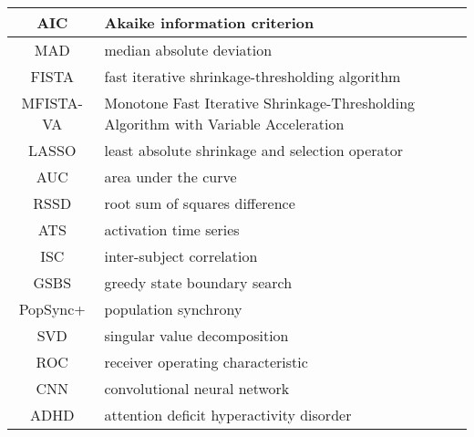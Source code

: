 \begin{table}[h]
\begin{tabular}{|c|p{}|}
    \hline
    AIC & Akaike information criterion \\
    \hline
    MAD & median absolute deviation \\
    \hline
    FISTA & fast iterative shrinkage-thresholding algorithm \\
    \hline
    MFISTA-VA & Monotone Fast Iterative Shrinkage-Thresholding Algorithm with Variable Acceleration \\
    \hline
    LASSO & least absolute shrinkage and selection operator \\
    \hline
    AUC & area under the curve \\
    \hline
    RSSD & root sum of squares difference \\
    \hline
    ATS & activation time series \\
    \hline
    ISC & inter-subject correlation \\
    \hline
    GSBS & greedy state boundary search \\
    \hline
    PopSync+ & population synchrony \\
    \hline
    SVD & singular value decomposition \\
    \hline
    ROC & receiver operating characteristic \\
    \hline
    CNN & convolutional neural network \\
    \hline
    ADHD & attention deficit hyperactivity disorder \\
    \hline
    \end{tabular}
\end{table}
